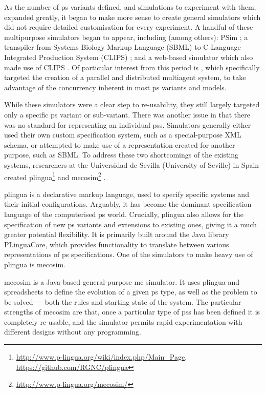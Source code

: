 As the number of \gls{ps} variants defined, and simulations to experiment with them, expanded greatly, it began to make more sense to create general simulators which did not require detailed customisation for every experiment.  A handful of these multipurpose simulators began to appear, including (among others): PSim \cite{Bianco2007,Bianco2007a}; a transpiler from Systems Biology Markup Language (SBML) to C Language Integrated Production System (CLIPS) \cite{NepomucenoChamorro2005};  and a web-based simulator which also made use of CLIPS \cite{Bonchis2005}.  Of particular interest from this period is \cite{Acampora2007}, which specifically targeted the creation of a parallel and distributed multiagent system, to take advantage of the concurrency inherent in most \gls{ps} variants and models.

While these simulators were a clear step to re-usability, they still largely targeted only a specific \gls{ps} variant or sub-variant.  There was another issue in that there was no standard for representing an individual \glspl{ps}.  Simulators generally either used their own custom specification system, such as a special-purpose XML schema, or attempted to make use of a representation created for another purpose, such as SBML.  To address these two shortcomings of the existing systems, researchers at the Universidad de Sevilla (University of Seville) in Spain created \gls{plingua}\footnote{\url{http://www.p-lingua.org/wiki/index.php/Main_Page}, \url{https://github.com/RGNC/plingua}} \cite{Diaz-Pernil2008a,Garcia-Quismondo2010} and \gls{mecosim}\footnote{\url{http://www.p-lingua.org/mecosim/}} \cite{Perez-Hurtado2010}.

\Gls{plingua} is a declarative markup language, used to specify specific systems and their initial configurations.  Arguably, it has become the dominant specification language of the computerised \gls{ps} world.  Crucially, \gls{plingua} also allows for the specification of new \gls{ps} variants and extensions to existing ones, giving it a much greater potential flexibility.  It is primarily built around the Java library PLinguaCore, which provides functionality to translate between various representations of \gls{ps} specifications.  One of the simulators to make heavy use of \gls{plingua} is \gls{mecosim}.

\Gls{mecosim} is a Java-based general-purpose \gls{mc} simulator.  It uses \gls{plingua} and spreadsheets to define the evolution of a given \gls{ps} type, as well as the problem to be solved --- both the rules and starting state of the system.  The particular strengths of \gls{mecosim} are that, once a particular type of \glspl{ps} has been defined it is completely re-usable, and the simulator permits rapid experimentation with different designs without any programming.%

